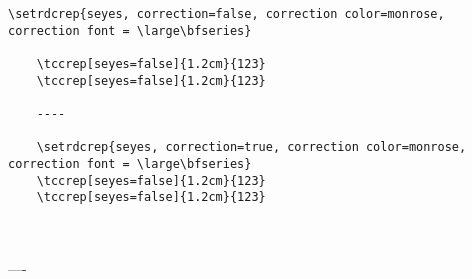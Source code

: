\begin{tcolorbox}[colback=yellow!10!white, title=Exemple d'utilisation pour \texttt{tccrep}]
\begin{minipage}{0.45\textwidth}
\begin{lstlisting}[breaklines]
    \setrdcrep{seyes, correction=false, correction color=monrose, correction font = \large\bfseries}

    \tccrep[seyes=false]{1.2cm}{123}
    \tccrep[seyes=false]{1.2cm}{123}

    ----

    \setrdcrep{seyes, correction=true, correction color=monrose, correction font = \large\bfseries}
    \tccrep[seyes=false]{1.2cm}{123}
    \tccrep[seyes=false]{1.2cm}{123}
\end{lstlisting}
\end{minipage}
\hfill
\begin{minipage}{0.45\textwidth}
\phantom{a}\\
    \\

    ----\\

\end{minipage}
\end{tcolorbox}
